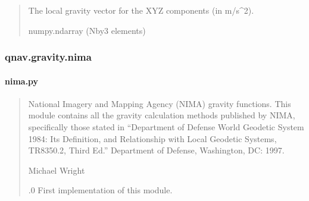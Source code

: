 \documentclass[letterpaper,10pt,english]{sphinxmanual}
\begin{document}
\begin{fulllineitems}
\begin{fulllineitems}
\begin{quote}
\begin{description}
\begin{itemize}
\end{itemize}

\sphinxAtStartPar
The local gravity vector for the XYZ components (in m/s\textasciicircum{}2).

\sphinxAtStartPar
numpy.ndarray (N\sphinxhyphen{}by\sphinxhyphen{}3 elements)

\end{description}\end{quote}

\end{fulllineitems}


\end{fulllineitems}


\sphinxstepscope


\subsubsection{qnav.gravity.nima}
\label{\detokenize{modules/gravity/nima:module-qnav.gravity.nima}}\label{\detokenize{modules/gravity/nima:qnav-gravity-nima}}\label{\detokenize{modules/gravity/nima::doc}}

\paragraph{nima.py}
\label{\detokenize{modules/gravity/nima:nima-py}}\begin{quote}\begin{description}
\sphinxAtStartPar
National Imagery and Mapping Agency (NIMA) gravity functions.
This module contains all the gravity calculation methods published by
NIMA, specifically those stated in “Department of Defense World
Geodetic System 1984: Its Definition, and Relationship with Local
Geodetic Systems, TR8350.2, Third Ed.” Department of Defense,
Washington, DC: 1997.

\sphinxAtStartPar
Michael Wright \sphinxhyphen{} 

.0 \sphinxhyphen{} First implementation of this module.

\end{description}\end{quote}
\end{document}
